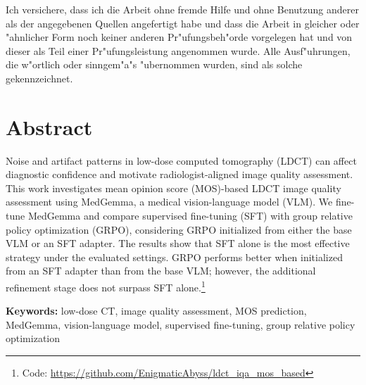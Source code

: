 \documentclass[english,pa]{lmedoc/lmedoc}
\begin{document}
\clearpage
\begin{deckblatt}
  \Ende{\today}
\end{deckblatt}

\cleardoublepage
Ich versichere, dass ich die Arbeit ohne fremde Hilfe und ohne Benutzung
anderer als der angegebenen Quellen angefertigt habe und dass die Arbeit
in gleicher oder "ahnlicher Form noch keiner anderen Pr"ufungsbeh"orde
vorgelegen hat und von dieser als Teil einer Pr"ufungsleistung
angenommen wurde. Alle Ausf"uhrungen, die w"ortlich oder sinngem"a"s
"ubernommen wurden, sind als solche gekennzeichnet.

\cleardoublepage
\chapter*{Abstract}
Noise and artifact patterns in low-dose computed tomography (LDCT) can affect diagnostic confidence and motivate radiologist-aligned image quality assessment. This work investigates mean opinion score (MOS)-based LDCT image quality assessment using MedGemma, a medical vision-language model (VLM). We fine-tune MedGemma and compare supervised fine-tuning (SFT) with group relative policy optimization (GRPO), considering GRPO initialized from either the base VLM or an SFT adapter. The results show that SFT alone is the most effective strategy under the evaluated settings. GRPO performs better when initialized from an SFT adapter than from the base VLM; however, the additional refinement stage does not surpass SFT alone.\footnote{Code: \url{https://github.com/EnigmaticAbyss/ldct_iqa_mos_based}}

\vspace{1em}
\noindent\textbf{Keywords:} low-dose CT, image quality assessment, MOS prediction, MedGemma, vision-language model, supervised fine-tuning, group relative policy optimization

\cleardoublepage
\tableofcontents

\cleardoublepage
{}








%

\cleardoublepage
\printunsrtglossary[type=abbreviations]

\cleardoublepage
{}
\listoffigures

\cleardoublepage
{}
\listoftables

\cleardoublepage
{}
\printbibliography
\end{document}
